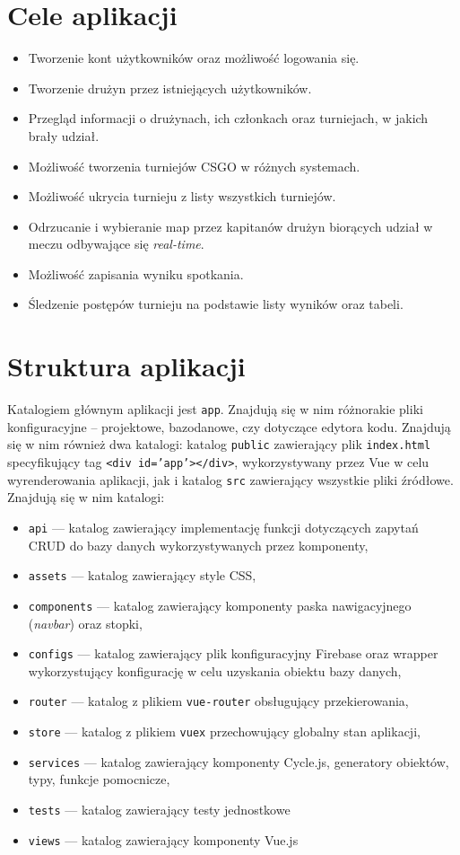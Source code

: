 \documentclass[shortabstract]{iithesis}
\theoremstyle{definition} \newtheorem{definition}{Definicja}[]
\theoremstyle{remark} \newtheorem{remark}[definition]{Observation}
\theoremstyle{plain} \newtheorem{theorem}[definition]{Theorem}
\theoremstyle{plain} \newtheorem{lemma}[definition]{Lemma}
\begin{document}
\section{Cele aplikacji}
\begin{itemize}
    \item Tworzenie kont użytkowników oraz możliwość logowania się.
    \item Tworzenie drużyn przez istniejących użytkowników.
    \item Przegląd informacji o drużynach, ich członkach oraz turniejach, w jakich brały udział.
    \item Możliwość tworzenia turniejów CSGO w różnych systemach.
    \item Możliwość ukrycia turnieju z listy wszystkich turniejów.
    \item Odrzucanie i wybieranie map przez kapitanów drużyn biorących udział w meczu odbywające się \textit{real-time}.
    \item Możliwość zapisania wyniku spotkania.
    \item Śledzenie postępów turnieju na podstawie listy wyników oraz tabeli.
\end{itemize}

\section{Struktura aplikacji}
Katalogiem głównym aplikacji jest \texttt{app}. Znajdują się w nim różnorakie pliki konfiguracyjne -- projektowe, bazodanowe, czy dotyczące edytora kodu. Znajdują się w nim również dwa katalogi: katalog \texttt{public} zawierający plik \texttt{index.html} specyfikujący tag \texttt{<div id='app'></div>}, wykorzystywany przez Vue w celu wyrenderowania aplikacji, jak i katalog \texttt{src} zawierający wszystkie pliki źródłowe. Znajdują się w nim katalogi:
\begin{itemize}
    \item \texttt{api} --- katalog zawierający implementację funkcji dotyczących zapytań CRUD do bazy danych wykorzystywanych przez komponenty,
    \item \texttt{assets} --- katalog zawierający style CSS,
    \item \texttt{components} --- katalog zawierający komponenty paska nawigacyjnego (\textit{navbar}) oraz stopki,
    \item \texttt{configs} --- katalog zawierający plik konfiguracyjny Firebase oraz wrapper wykorzystujący konfigurację w celu uzyskania obiektu bazy danych,
    \item \texttt{router} --- katalog z plikiem \texttt{vue-router} obsługujący przekierowania,
    \item \texttt{store} --- katalog z plikiem \texttt{vuex} przechowujący globalny stan aplikacji,
    \item \texttt{services} --- katalog zawierający komponenty Cycle.js, generatory obiektów, typy, funkcje pomocnicze,
    \item \texttt{tests} --- katalog zawierający testy jednostkowe
    \item \texttt{views} --- katalog zawierający komponenty Vue.js
\end{itemize}
\end{document}
